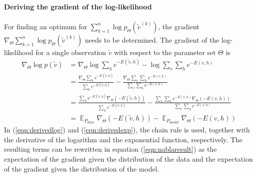 \documentclass[12pt]{article}
\DeclareMathOperator{\EX}{\mathbb{E}}
\begin{document}
\paragraph{Deriving the gradient of the log-likelihood}

For finding an optimum for $\sum_{k=1}^{n}  \log p_\Theta(\widetilde{v}^{(k)})$, the gradient $\nabla_\Theta \sum_{k=1}^{n}  \log p_\Theta(\widetilde{v}^{(k)})$ needs to be determined.
The gradient of the log-likelihood for a single observation
$\widetilde{v} $ with respect to the parameter set $\Theta$ is
\begin{align}
\nabla_{\!\Theta}  \log p(\widetilde{v}) &= \nabla_{\!\Theta}   \log \sum_h e^{-E(\widetilde{v}, h)} - \log \sum_v \sum_h e^{-E(v, h)} \nonumber \\
 &= \frac{\nabla_{\!\Theta} \sum_h e^{-E(\widetilde{v}, h)}}{\sum_h e ^{-E(\widetilde{v}, h)}} - \frac{\nabla_{\!\Theta} \sum_v \sum_h e^{-E(v,h)}}{\sum_v \sum_h e^{-E(v,h)}} \label{eqn:derivedlog}\\
&=  \frac{\sum_h e^{-E(\widetilde{v}, h)} \nabla_{\!\Theta} (-E(\widetilde{v}, h))} {\sum_h e^{-E(\widetilde{v}, h)}} - \frac{\sum_v \sum_h e^{-E(v, h)} \nabla_{\!\Theta} (-E(v, h))}{\sum_v \sum_h e^{-E(v, h)}} \label{eqn:derivedexp}\\
&=  \EX_{P_\text{data}} \nabla_{\!\Theta} (- E(\widetilde{v},h)) - \EX_{P_\text{model}} \nabla_{\!\Theta} (-E(v,h)) \label{eqn:nablaresult}
\end{align}
In (\ref{eqn:derivedlog}) and (\ref{eqn:derivedexp}), the chain rule is used, together with the derivative of the logarithm and the exponential function, respectively. The resulting terms can be rewritten in equation (\ref{eqn:nablaresult}) as the expectation of the gradient given the distribution of the data and the expectation of the gradient given the distribution of the model.
\end{document}
